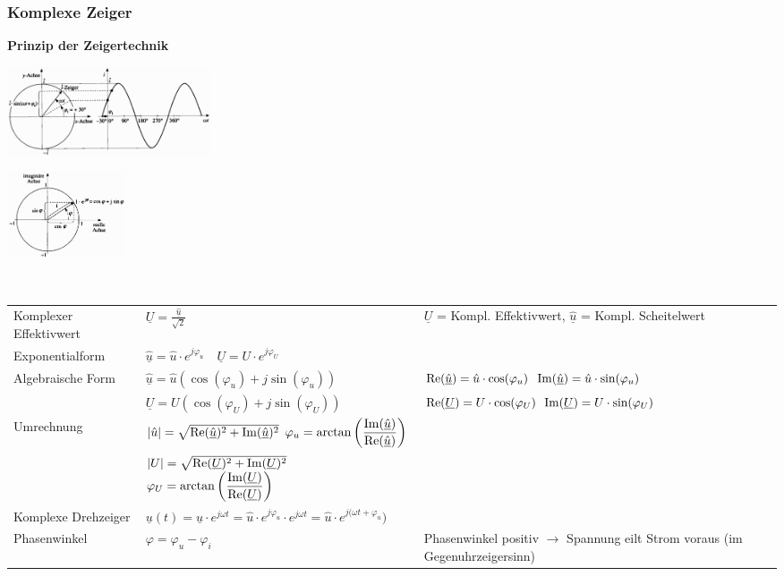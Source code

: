 		\subsubsection{Komplexe Zeiger}
			\begin{minipage}[t]{6cm}
            	\textbf{Prinzip der Zeigertechnik}
            \end{minipage}
			\begin{minipage}{6cm}
            	\includegraphics[width=6cm]{bilder/RotierenderScheitelwertzeiger.png}
            \end{minipage}
			\begin{minipage}{3.5cm}
            	\includegraphics[width=3.5cm]{bilder/EulerscheRelation.png}
            \end{minipage} \\
			\begin{tabular}{p{5cm}p{4.5cm}p{8.5cm}}
            	Komplexer Effektivwert &
            		$\underline{U} = \frac{\underline{\hat{u}}}{\sqrt{2}}$ &
            		$\underline{U}$ = Kompl. Effektivwert, $\underline{\hat{u}}$ = Kompl. Scheitelwert \\
				Exponentialform &
					$\underline{\hat{u}} = \hat{u} \cdot e^{j\varphi_u} \quad \underline{U} = U \cdot e^{j\varphi_U}$ \\
				Algebraische Form &
					$\underline{\hat{u}} = \hat{u} (\cos(\varphi_u)+j\sin(\varphi_u))$ &
					$\operatorname{Re}(\underline{\hat{u}}) = \hat{u} \cdot \cos(\varphi_u)$ \quad $\operatorname{Im}(\underline{\hat{u}}) = \hat{u} \cdot \sin(\varphi_u)$ \\
				&	$\underline{U} = U (\cos(\varphi_U)+j\sin(\varphi_U))$ &
					$\operatorname{Re}(\underline{U}) = U \cdot \cos(\varphi_U)$ \quad $\operatorname{Im}(\underline{U}) = U \cdot \sin(\varphi_U)$ \\
				Umrechnung &
					$|\hat{u}| = \sqrt{\operatorname{Re}(\underline{\hat{u}})^2 + \operatorname{Im}(\underline{\hat{u}})^2}$ \quad $\varphi_u = \arctan\left(\dfrac{\operatorname{Im}(\underline{\hat{u}})}{\operatorname{Re}(\underline{\hat{u}})}\right)$ \\
				&	$|U| = \sqrt{\operatorname{Re}(\underline{U})^2 + \operatorname{Im}(\underline{U})^2}$ \quad $\varphi_U = \arctan\left(\dfrac{\operatorname{Im}(\underline{U})}{\operatorname{Re}(\underline{U})}\right)$ \\
				Komplexe Drehzeiger &
					$\underline{u}(t) = \underline{\hat{u}} \cdot e^{j\omega t} = \hat{u} \cdot e^{j\varphi_u} \cdot e^{j\omega t} = \hat{u} \cdot e^{j(\omega t + \varphi_u})$ \\
				Phasenwinkel &
					$\varphi = \varphi_u - \varphi_i$ &
					Phasenwinkel positiv $\rightarrow$ Spannung eilt Strom voraus (im Gegenuhrzeigersinn) \\
			\end{tabular}
